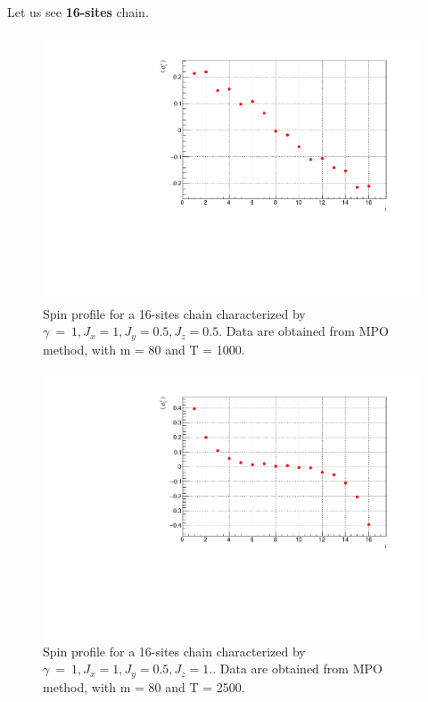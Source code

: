 Let us see \textbf{16-sites} chain.

\begin{figure}[H]
    \centering
    \includegraphics[scale=0.7]{Figures/16sites/LML016m080Time001000_J10505.pdf}
    \caption{Spin profile for a 16-sites chain characterized by $\gamma~=~1, J_x=1, J_y=0.5, J_z=0.5$. Data are obtained from MPO method, with m = 80 and T = 1000.}
    \label{fig:my_label}
\end{figure}

\begin{figure}[H]
    \centering
    \includegraphics[scale=0.7]{Figures/16sites/LML016m080Time002500_J1051.pdf}
    \caption{Spin profile for a 16-sites chain characterized by $\gamma~=~1, J_x=1, J_y=0.5, J_z=1.$. Data are obtained from MPO method, with m = 80 and T = 2500.}
    \label{fig:my_label}
\end{figure}

